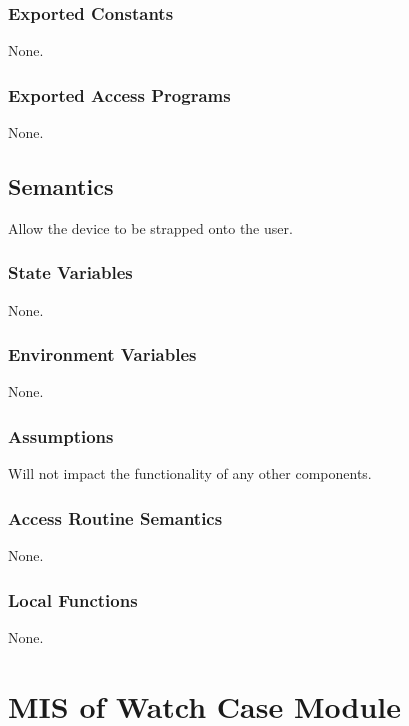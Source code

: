\documentclass[12pt, titlepage]{article}
\begin{document}
\subsubsection{Exported Constants}

None.

\subsubsection{Exported Access Programs}

None.

\subsection{Semantics}

Allow the device to be strapped onto the user.

\subsubsection{State Variables}

None.

\subsubsection{Environment Variables}

None.

\subsubsection{Assumptions}

Will not impact the functionality of any other components.

\subsubsection{Access Routine Semantics}

None.

\subsubsection{Local Functions}

None.

\newpage


\section{MIS of Watch Case Module} \label{mPD2} 
\end{document}
